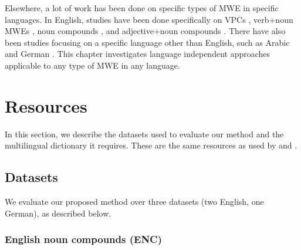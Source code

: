 \documentclass[output=paper
,modfonts
,nonflat]{langsci/langscibook}
\begin{document}
Elsewhere, a lot of work has been done on specific types of MWE in
specific languages.  In English, studies have been done specifically
on VPCs \citep{mccarthy2003,bannard2003}, verb+noun MWEs
\citep{venkatapathy2005,mccarthy2007,fazly-cook-stevenson:2009:CL},
noun compounds \citep{reddy2011a}, and adjective+noun compounds
\citep{vecchi2011}.  There have also been studies focusing on a
specific language other than English, such as Arabic \citep{saif2013}
and German \citep{SchulteImWalde+:2013}. This chapter investigates
language independent approaches applicable to any type of MWE in any
language.




\section{Resources}

In this section, we describe the datasets used to evaluate our method
and the multilingual dictionary it requires. These are the same
resources as used by \cite{salehi2013} and
\cite{DBLP:conf/eacl/SalehiCB14}.

\subsection{Datasets}
\label{salehi:sec:dataset}

We evaluate our proposed method over three datasets (two English, one
German), as described below.

\subsubsection{English noun compounds (ENC)}
\label{sec:enc}
\end{document}
